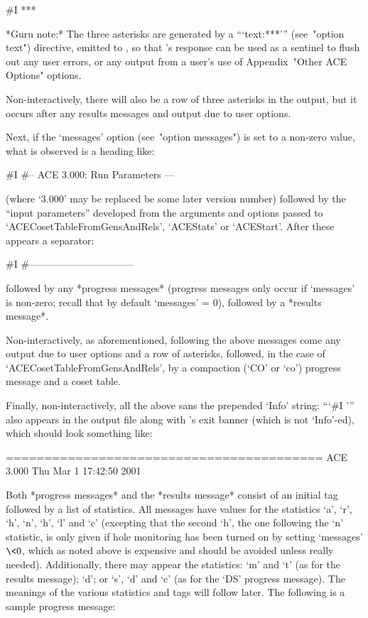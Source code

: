\beginexample
#I  ***
\endexample

*Guru note:*
The three asterisks are generated  by  a  ```text:***'''  (see~"option
text") directive, emitted to {\ACE}, so that {\ACE}'s response can  be
used as a sentinel to flush out any user errors, or any output from  a
user's use of Appendix~"Other ACE Options" options.

Non-interactively, there will also be a row of three asterisks in  the
output, but it occurs after any results messages  and  output  due  to
user options.

Next, if the `messages' option (see~"option messages")  is  set  to  a
non-zero value, what is observed is a heading like:

\beginexample
#I    #-- ACE 3.000: Run Parameters ---
\endexample

(where `3.000' may be replaced be some later version number)  followed
by the ``input parameters'' developed from the arguments  and  options
passed to `ACECosetTableFromGensAndRels',  `ACEStats'  or  `ACEStart'.
After these appears a separator:

\beginexample
#I    #--------------------------------
\endexample

followed by any *progress messages* (progress messages only  occur  if
`messages' is non-zero;  recall  that  by  default  `messages'  =  0),
followed by a *results message*.

Non-interactively, as aforementioned,  following  the  above  messages
come any output due to user options and a row of asterisks,  followed,
in the case of `ACECosetTableFromGensAndRels', by a  compaction  (`CO'
or `co') progress message and a coset table.

Finally, non-interactively, all the above sans  the  prepended  `Info'
string: ```\#I ''' also appears in the output file along with {\ACE}'s
exit banner (which is not  `Info'-ed),  which  should  look  something
like:

\beginexample
=========================================
ACE 3.000        Thu Mar  1 17:42:50 2001
\endexample

Both *progress messages* and  the  *results  message*  consist  of  an
initial tag followed by a list of statistics. All messages have values
for the statistics `a', `r', `h', `n', `h',  `l'  and  `c'  (excepting
that the second `h', the one following  the  `n'  statistic,  is  only
given if hole monitoring has been turned on by setting `messages'  $\<
0$, which as noted above is expensive and  should  be  avoided  unless
really needed). Additionally, there may appear the statistics: `m' and
`t' (as for the results message); `d'; or `s', `d' and `c' (as for the
`DS' progress message). The meanings of  the  various  statistics  and
tags will follow later. The following is a sample progress message:

